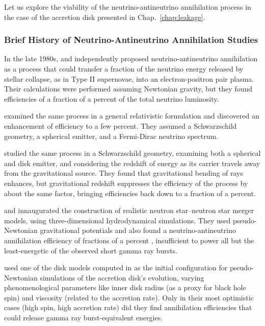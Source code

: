 Let us explore the viability of the neutrino-antineutrino annihilation process
in the case of the accretion disk presented in Chap.~\ref{chap:leakage}.

\subsubsection{Brief History of Neutrino-Antineutrino Annihilation Studies}
\label{sssc:nunubar_review}
In the late 1980s, \cite{good1987-nunubar} and \cite{bere1987-nunubar}
independently proposed neutrino-antineutrino annihilation as a process that could
transfer a fraction of the neutrino energy released by stellar collapse, as in
Type II supernovae, into an electron-positron pair plasma. Their calculations
were performed assuming Newtonian gravity, but they found efficiencies of a
fraction of a percent of the total neutrino luminosity.

\cite{salm1999-nunubar} examined the same process in a general relativistic
formulation and discovered an enhancement of efficiency to a few percent.
They assumed a Schwarzschild geometry, a spherical emitter, and a Fermi-Dirac
neutrino spectrum.

\cite{asan2000-nunubar} studied the same process in a Schwarzschild geometry,
examining both a spherical and disk emitter, and considering the
redshift of energy as its carrier travels away from the gravitational source.
They found that gravitational bending of rays enhances, but gravitational
redshift suppresses the efficiency of the process by about the same factor,
bringing efficiencies back down to a fraction of a percent.

\citet{ruff1996-leakage_part1,ruff1997-leakage_part2,ruff2001-leakage_part3} and
\citet{ross2002-leakage_part1,ross2003-leakage_part2,ross2003-leakage_part3}
innaugurated the
construction of realistic neutron star--neutron star merger models, using
three-dimensional hydrodynamical simulations.
They used pseudo-Newtonian gravitational potentials and also found a
neutrino-antineutrino annihilation efficiency of fractions of a percent
\citep{ruff1999-nunubar_nsns,ross2003-leakage_part3},
insufficient to power all but the least-energetic of the observed
short gamma ray bursts.

\cite{seti2006-nunubar_and_spin} used one of the disk models computed in
\cite{ruff1996-leakage_part1}
as the initial configuration for pseudo-Newtonian simulations of the
accretion disk's evolution, varying phenomenological parameters like inner disk
radius (as a proxy for black hole spin) and viscosity (related to the
accretion rate). Only in their most optimistic cases (high spin, high
accretion rate) did they find annihilation
efficiencies that could release gamma ray burst-equivalent energies.

